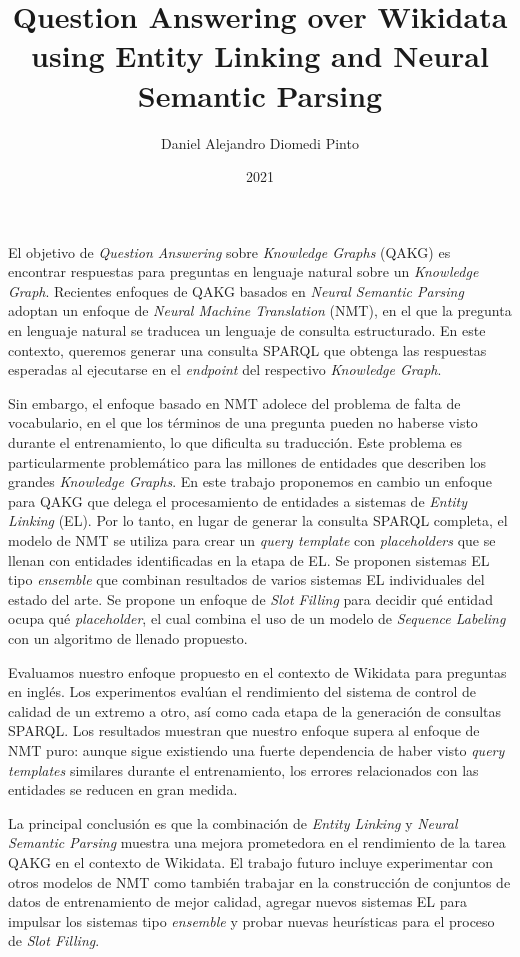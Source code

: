 \documentclass[upright, contnum]{umemoria}
\author{Daniel Alejandro Diomedi Pinto}
\title{Question Answering over Wikidata using Entity Linking and Neural Semantic Parsing}
\date{2021}
\begin{document}
\frontmatter
\maketitle

\begin{resumen}
    {
    El objetivo de \textit{Question Answering} sobre \textit{Knowledge Graphs} (QAKG) es encontrar
    respuestas para preguntas en lenguaje natural sobre un \textit{Knowledge Graph}. Recientes enfoques 
    de QAKG basados en \textit{Neural Semantic Parsing} adoptan un enfoque de \textit{Neural 
    Machine Translation} (NMT), en el que la pregunta en lenguaje natural se traducea un lenguaje de 
    consulta estructurado. En este contexto, queremos generar una consulta SPARQL que obtenga las 
    respuestas esperadas al ejecutarse en el \textit{endpoint} del respectivo \textit{Knowledge Graph}.

    Sin embargo, el enfoque basado en NMT adolece del problema de falta de vocabulario, en el que los 
    términos de una pregunta pueden no haberse visto durante el entrenamiento, lo que dificulta su 
    traducción. Este problema es particularmente problemático para las millones de entidades que 
    describen los grandes \textit{Knowledge Graphs}. En este trabajo proponemos en cambio un enfoque 
    para QAKG que delega el procesamiento de entidades a sistemas de \textit{Entity Linking} (EL). Por 
    lo tanto, en lugar de generar la consulta SPARQL completa, el modelo de NMT se utiliza para crear 
    un \textit{query template} con \textit{placeholders} que se llenan con entidades identificadas en 
    la etapa de EL. Se proponen sistemas EL tipo \textit{ensemble} que combinan resultados de varios 
    sistemas EL individuales del estado del arte. Se propone un enfoque de \textit{Slot Filling} para 
    decidir qué entidad ocupa qué \textit{placeholder}, el cual combina el uso de un modelo de 
    \textit{Sequence Labeling} con un algoritmo de llenado propuesto.

    Evaluamos nuestro enfoque propuesto en el contexto de Wikidata para preguntas en inglés. Los 
    experimentos evalúan el rendimiento del sistema de control de calidad de un extremo a otro, así 
    como cada etapa de la generación de consultas SPARQL. Los resultados muestran que nuestro enfoque 
    supera al enfoque de NMT puro: aunque sigue existiendo una fuerte dependencia de haber visto 
    \textit{query templates} similares durante el entrenamiento, los errores relacionados con las 
    entidades se reducen en gran medida.

    La principal conclusión es que la combinación de \textit{Entity Linking} y \textit{Neural Semantic 
    Parsing} muestra una mejora prometedora en el rendimiento de la tarea QAKG en el contexto de Wikidata. 
    El trabajo futuro incluye experimentar con otros modelos de NMT como también trabajar en la 
    construcción de conjuntos de datos de entrenamiento de mejor calidad, agregar nuevos sistemas EL para 
    impulsar los sistemas tipo \textit{ensemble} y probar nuevas heurísticas para el proceso de 
    \textit{Slot Filling}.
    }
\end{resumen}
\end{document}
